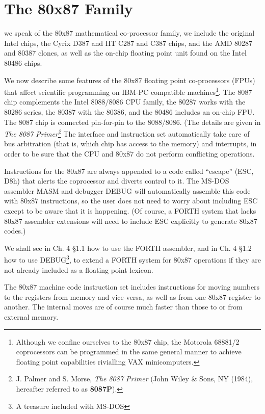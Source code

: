 \chapter{The 80x87 Family}
\startcontents[chapters]

 we speak of the 80x87 mathematical co-processor family, we include the original Intel chips, the Cyrix D387 and HT C287 and C387 chips, and the AMD 80287 and 80387 clones, as well as the on-chip floating point unit found on the Intel 80486 chips.

We now describe some features of the 80x87 floating point co-processors (FPUs) that affect scientific programming on IBM-PC compatible machines\footnote{Although we confine ourselves to the 80x87 chip, the Motorola 68881/2 coprocessors can be programmed in  the same general manner to achieve floating point capabilities rivialling VAX minicomputers.}. The 8087 chip complements the Intel 8088/8086 CPU family, the 80287 works with the 80286 series, the 80387 with the 80386, and the 80486 includes an on-chip FPU. The 8087 chip is connected pin-for-pin to the 8088/8086. (The details are given in \textit{The 8087 Primer\footnote{J. Palmer and S. Morse, \textit{The 8087 Primer} (John Wiley \& Sons, NY (1984), hereafter referred to as \textbf{8087P}).}} The interface and instruction set automatically take care of bus arbitration (that is, which chip has access to the memory) and interrupts, in order to be sure that the CPU and 80x87 do not perform conflicting operations.

Instructions for the 80x87 are always appended to a code called “escape” (ESC, D8h) that alerts the coprocessor and diverts control to it. The MS-DOS assembler MASM and debugger DEBUG will automatically assemble this code with 80x87 instructions, so the user does not need to worry about including ESC except to be aware that it is happening. (Of course, a FORTH system that lacks 80x87 assembler extensions will need to include ESC explicitly to generate 80x87 codes.)

We shall see in Ch. 4 §1.1 how to use the FORTH assembler, and in Ch. 4 §1.2 how to use DEBUG\footnote{A treasure included with MS-DOS}, to extend a FORTH system for 80x87 operations if they are not already included as a floating point lexicon.

The 80x87 machine code instruction set includes instructions for moving numbers to the registers from memory and vice-versa, as well as from one 80x87 register to another. The internal moves are of course much faster than those to or from external memory.

